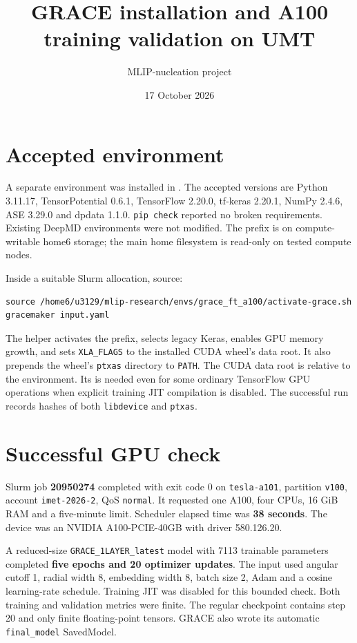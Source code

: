 \documentclass[10pt,a4paper]{article}
\title{GRACE installation and A100 training validation on UMT}
\author{MLIP-nucleation project}
\date{17 October 2026}
\begin{document}
\maketitle

\section{Accepted environment}
A separate environment was installed in
.
The accepted versions are Python 3.11.17, TensorPotential 0.6.1,
TensorFlow 2.20.0, tf-keras 2.20.1, NumPy 2.4.6, ASE 3.29.0 and dpdata 1.1.0.
\texttt{pip check} reported no broken requirements. Existing DeepMD environments
were not modified. The prefix is on compute-writable home6 storage; the main
home filesystem is read-only on tested compute nodes.

Inside a suitable Slurm allocation, source:
\begin{verbatim}
source /home6/u3129/mlip-research/envs/grace_ft_a100/activate-grace.sh
gracemaker input.yaml
\end{verbatim}
The helper activates the prefix, selects legacy Keras, enables GPU memory growth,
and sets \texttt{XLA\_FLAGS} to the installed CUDA wheel's data root. It also
prepends the wheel's \texttt{ptxas} directory to \texttt{PATH}.
The CUDA data root is 
relative to the environment. Its  is
needed even for some ordinary TensorFlow GPU operations when explicit
training JIT compilation is disabled. The successful run records hashes of
both \texttt{libdevice} and \texttt{ptxas}.

\section{Successful GPU check}
Slurm job \textbf{20950274} completed with exit code 0 on
\texttt{tesla-a101}, partition \texttt{v100}, account \texttt{imet-2026-2},
QoS \texttt{normal}. It requested one A100, four CPUs, 16 GiB RAM and a
five-minute limit. Scheduler elapsed time was \textbf{38 seconds}.
The device was an NVIDIA A100-PCIE-40GB with driver 580.126.20.

A reduced-size \texttt{GRACE\_1LAYER\_latest} model with 7113 trainable
parameters completed \textbf{five epochs and 20 optimizer updates}.
The input used angular cutoff 1, radial width 8, embedding width 8,
batch size 2, Adam and a cosine learning-rate schedule. Training JIT was
disabled for this bounded check. Both training and validation metrics were
finite. The regular checkpoint contains step 20 and only finite floating-point
tensors. GRACE also wrote its automatic \texttt{final\_model} SavedModel.
\end{document}
